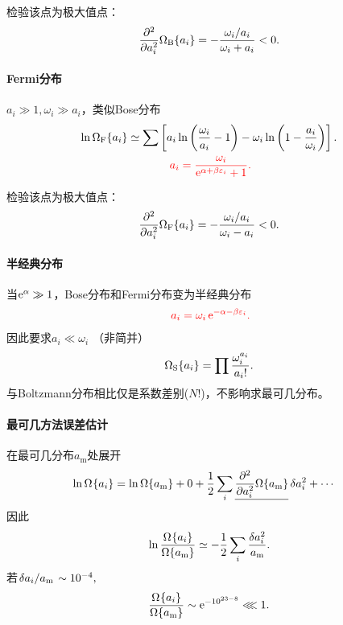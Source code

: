 检验该点为极大值点：
\[
	\pp[2]{a_i}\Om[B]=-\frac{\omega_i/a_i}{\omega_i+a_i}<0.
\]
\paragraph{Fermi分布}
$a_i\gg 1,\omega_i\gg a_i$，类似Bose分布
\begin{gather}\notag
	\ln\Om[F]\simeq\sum\fkh{a_i\ln\kh{\frac{\omega_i}{a_i}-1}-\omega_i\ln\kh{1-\frac{a_i}{\omega_i}}}.\\
	\spark{a_i=\frac{\omega_i}{\e{\alpha+\beta\varepsilon_i}+1}.}
\end{gather}


检验该点为极大值点：
\[
	\pp[2]{a_i}\Om[F]=-\frac{\omega_i/a_i}{\omega_i-a_i}<0.
\]
\paragraph*{半经典分布}
当$\e\alpha\gg 1$，Bose分布和Fermi分布变为半经典分布
\begin{align}
	\spark{a_i=\omega_i\e{-\alpha-\beta\varepsilon_i}.}
\end{align}
因此要求$a_i\ll\omega_i$ （非简并）
\begin{align}
	\Om[S]=\prod\frac{\omega_i^{a_i}}{a_i!}.
\end{align}
与Boltzmann分布相比仅是系数差别($N!$)，不影响求最可几分布。
\paragraph*{最可几方法误差估计}
在最可几分布$a_\mathrm m$处展开
\begin{align*}
	\ln\Om & =\ln\Omm+0+\frac12\sum_i\underline{\pn 2{a_i}\Omm}\,\delta a_i^2+\cdots
\end{align*}
因此
\[
	\ln\frac\Om\Omm\simeq-\frac12\sum_i\frac{\delta a_i^2}{a_\mathrm m}.
\]
若$\dvd{\delta a_i}{a_\mathrm m}\sim 10^{-4},$
\[
	\frac\Om\Omm\sim\e{-10^{23-8}}\lll 1.
\]
